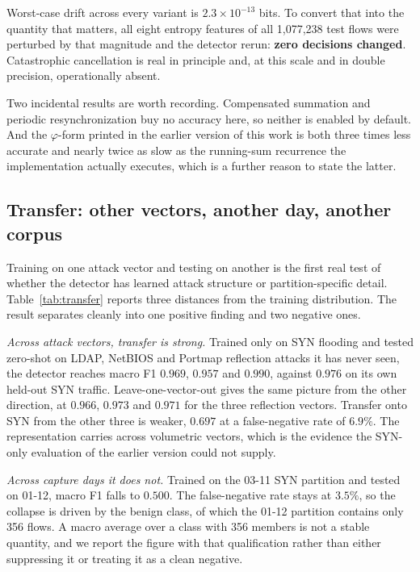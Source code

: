 \documentclass{ieeeaccess}
\begin{document}
Worst-case drift across every variant is $2.3\times10^{-13}$ bits. To convert
that into the quantity that matters, all eight entropy features of all
1{,}077{,}238 test flows were perturbed by that magnitude and the detector rerun:
\textbf{zero decisions changed}. Catastrophic cancellation is real in principle
and, at this scale and in double precision, operationally absent.

Two incidental results are worth recording. Compensated summation and periodic
resynchronization buy no accuracy here, so neither is enabled by default. And the
$\varphi$-form printed in the earlier version of this work is both three times
less accurate and nearly twice as slow as the running-sum recurrence the
implementation actually executes, which is a further reason to state the latter.

\subsection{Transfer: other vectors, another day, another corpus}
\label{sec:crossvector}
\label{sec:crossdataset}
Training on one attack vector and testing on another is the first real test of
whether the detector has learned attack structure or partition-specific detail.
Table~\ref{tab:transfer} reports three distances from the training distribution.
The result separates cleanly into one positive finding and two negative ones.

\emph{Across attack vectors, transfer is strong.} Trained only on SYN flooding
and tested zero-shot on LDAP, NetBIOS and Portmap reflection attacks it has never
seen, the detector reaches macro F1 $0.969$, $0.957$ and $0.990$, against $0.976$
on its own held-out SYN traffic. Leave-one-vector-out gives the same picture from
the other direction, at $0.966$, $0.973$ and $0.971$ for the three reflection
vectors. Transfer onto SYN from the other three is weaker, $0.697$ at a
false-negative rate of $6.9\%$. The representation carries across volumetric
vectors, which is the evidence the SYN-only evaluation of the earlier version
could not supply.

\emph{Across capture days it does not.} Trained on the 03-11 SYN partition and
tested on 01-12, macro F1 falls to $0.500$. The false-negative rate stays at
$3.5\%$, so the collapse is driven by the benign class, of which the 01-12
partition contains only 356 flows. A macro average over a class with 356 members
is not a stable quantity, and we report the figure with that qualification rather
than either suppressing it or treating it as a clean negative.
\end{document}
